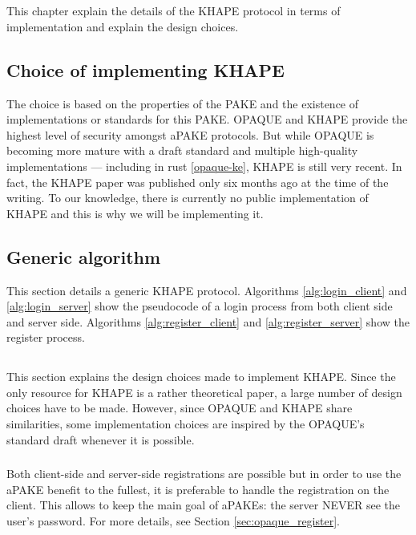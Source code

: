 ﻿\documentclass[../report.tex]{subfiles}
\begin{document}
\chapter{} \label{cha:khape}
This chapter explain the details of the KHAPE protocol in terms of implementation and explain the design choices.
\section{Choice of implementing KHAPE}
The choice is based on the properties of the PAKE and the existence of implementations or standards for this PAKE.
OPAQUE and KHAPE provide the highest level of security amongst aPAKE protocols.
But while OPAQUE is becoming more mature with a draft standard and multiple high-quality implementations --- including in rust \ref{opaque-ke}, KHAPE is still very recent.
In fact, the KHAPE paper was published only six months ago at the time of the writing. To our knowledge, there is currently no public implementation of KHAPE and this is why we will be implementing it.
\section{Generic algorithm} \label{sec:khape_generic_algo}
This section details a generic KHAPE protocol.
Algorithms \ref{alg:login_client} and \ref{alg:login_server} show the pseudocode of a login process from both client side and server side. Algorithms \ref{alg:register_client} and \ref{alg:register_server} show the register process.



\section{}
This section explains the design choices made to implement KHAPE.
Since the only resource for KHAPE is a rather theoretical paper, a large number of  design choices have to be made. However, since OPAQUE and KHAPE share similarities, some implementation choices are inspired by the OPAQUE's standard draft whenever it is possible.


\subsection{}
Both client-side and server-side registrations are possible but in order to use the aPAKE benefit to the fullest, it is preferable to handle the registration on the client.
This allows to keep the main goal of aPAKEs: the server NEVER see the user's password.
For more details, see Section \ref{sec:opaque_register}.
\end{document}
